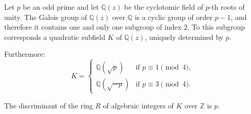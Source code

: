 Let $p$ be an odd prime and let $\mathbb{Q}(z)$ be the cyclotomic field of $p$-th roots of unity. The Galois group of $\mathbb{Q}(z)$ over $\mathbb{Q}$ is a cyclic group of order $p-1$, and therefore it contains one and only one subgroup of index $2$. To this subgroup corresponds a quadratic subfield $K$ of $\mathbb{Q}(z)$, uniquely determined by $p$.

Furthermore:
$$K = \begin{cases}
\mathbb{Q}(\sqrt{p}) & \text{if } p \equiv 1 \pmod{4},\\[4pt]
\mathbb{Q}(\sqrt{-p}) & \text{if } p \equiv 3 \pmod{4}.
\end{cases}$$

The discriminant of the ring $R$ of algebraic integers of $K$ over $\mathbb{Z}$ is $p$.
